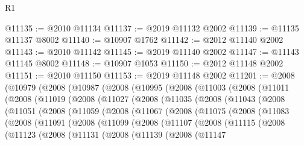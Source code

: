 \begin{lexlean}{R1}
\begin{coremodule}
@11135 := @2010 @11134
@11137 := @2019 @11132 @2002
@11139 := @11135 @11137 @8002
@11140 := @10907 @1762
@11142 := @2012 @11140 @2002
@11143 := @2010 @11142
@11145 := @2019 @11140 @2002
@11147 := @11143 @11145 @8002
@11148 := @10907 @1053
@11150 := @2012 @11148 @2002
@11151 := @2010 @11150
@11153 := @2019 @11148 @2002
@11201 := @2008
    (@10979
      (@2008
        (@10987
          (@2008
            (@10995
              (@2008
                (@11003
                  (@2008
                    (@11011
                      (@2008
                        (@11019
                          (@2008
                            (@11027
                              (@2008
                                (@11035
                                  (@2008
                                    (@11043
                                      (@2008
                                        (@11051
                                          (@2008
                                            (@11059
                                              (@2008
                                                (@11067
                                                  (@2008
                                                    (@11075
                                                      (@2008
                                                        (@11083
                                                          (@2008
                                                            (@11091
                                                              (@2008
                                                                (@11099
                                                                  (@2008
                                                                    (@11107
                                                                      (@2008
                                                                        (@11115
                                                                          (@2008
                                                                            (@11123
                                                                              (@2008
                                                                                (@11131
                                                                                  (@2008
                                                                                    (@11139
                                                                                      (@2008
                                                                                        (@11147

\end{coremodule}
\end{lexlean}
